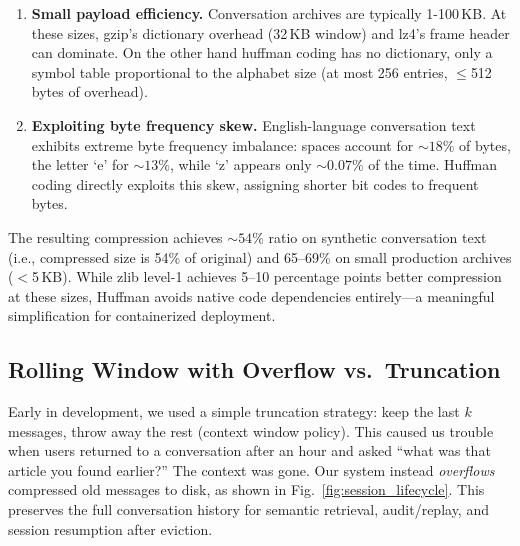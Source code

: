 \documentclass[conference]{IEEEtran}
\begin{document}
\begin{enumerate}
\item \textbf{Small payload efficiency.} Conversation archives are typically 1-100\,KB. At these sizes, gzip's dictionary overhead (32\,KB window) and lz4's frame header can dominate. On the other hand huffman coding has no dictionary, only a symbol table proportional to the alphabet size (at most 256 entries, $\leq$512 bytes of overhead).

\item \textbf{Exploiting byte frequency skew.} English-language conversation text exhibits extreme byte frequency imbalance: spaces account for ${\sim}18\%$ of bytes, the letter `e' for ${\sim}13\%$, while `z' appears only ${\sim}0.07\%$ of the time. Huffman coding directly exploits this skew, assigning shorter bit codes to frequent bytes.

\end{enumerate}

The resulting compression achieves ${\sim}54\%$ ratio on synthetic conversation text (i.e., compressed size is 54\% of original) and 65--69\% on small production archives ($<$5\,KB). While zlib level-1 achieves 5--10 percentage points better compression at these sizes, Huffman avoids native code dependencies entirely---a meaningful simplification for containerized deployment.

\subsection{Rolling Window with Overflow vs.\ Truncation}

Early in development, we used a simple truncation strategy: keep the last $k$ messages, throw away the rest (context window policy). This caused us trouble when users returned to a conversation after an hour and asked ``what was that article you found earlier?'' The context was gone. Our system instead \emph{overflows} compressed old messages to disk, as shown in Fig.~\ref{fig:session_lifecycle}. This preserves the full conversation history for semantic retrieval, audit/replay, and session resumption after eviction.
\end{document}
